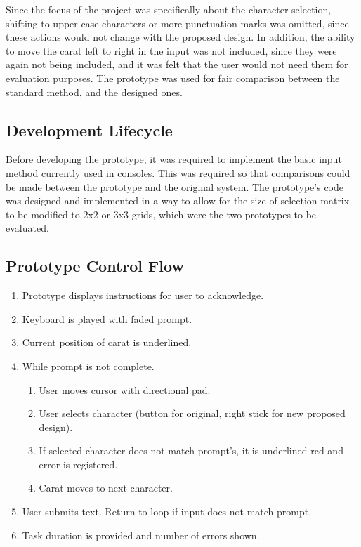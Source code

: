 \documentclass[prototype.tex]{subfiles}
\begin{document}
Since the focus of the project was specifically about the character selection,
shifting to upper case characters or more punctuation marks was omitted, since
these actions would not change with the proposed design. In addition, the
ability to move the carat left to right in the input was not included, since
they were again not being included, and it was felt that the user would not
need them for evaluation purposes. The prototype was used for fair comparison
between the standard method, and the designed ones.

\subsection{Development Lifecycle} %
\label{sub:development_lifecycle}
Before developing the prototype, it was required to implement the basic input
method currently used in consoles. This was required so that comparisons could
be made between the prototype and the original system. The prototype's code was
designed and implemented in a way to allow for the size of selection matrix to
be modified to 2x2 or 3x3 grids, which were the two prototypes to be evaluated.

\subsection{Prototype Control Flow} %
\label{sub:prototype_control_flow}
\begin{enumerate}
	\item Prototype displays instructions for user to acknowledge.
	\item Keyboard is played with faded prompt.
	\item Current position of carat is underlined.
	\item While prompt is not complete.
	\begin{enumerate}
		\item User moves cursor with directional pad.
		\item User selects character (button for original, right stick for
		new proposed design).
		\item If selected character does not match prompt's, it is underlined
		red and error is registered.
		\item Carat moves to next character.
	\end{enumerate}
	\item User submits text. Return to loop if input does not match prompt.
	\item Task duration is provided and number of errors shown.
\end{enumerate}
\end{document}
